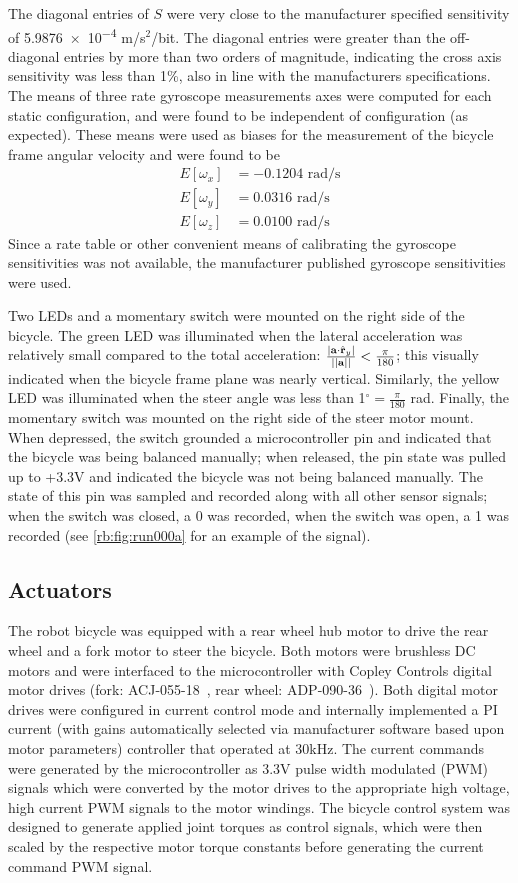 The diagonal entries of $S$ were very close to the manufacturer specified
sensitivity of \num{5.9876e-4} m/s$^2$/bit. The diagonal entries were greater than
the off-diagonal entries by more than two orders of magnitude, indicating the
cross axis sensitivity was less than 1\%, also in line with the manufacturers
specifications. The means of three rate gyroscope measurements axes were
computed for each static configuration, and were found to be independent of
configuration (as expected). These means were used as biases for the
measurement of the bicycle frame angular velocity and were found to be
\begin{align}
  E[\omega_x] &= -0.1204\text{ rad/s}\\
  E[\omega_y] &=  0.0316 \text{ rad/s}\\
  E[\omega_z] &=  0.0100 \text{ rad/s}
\end{align}
Since a rate table or other convenient means of calibrating the gyroscope
sensitivities was not available, the manufacturer published gyroscope
sensitivities were used.

Two LEDs and a momentary switch were mounted on the right side of the bicycle.
The green LED was illuminated when the lateral acceleration was relatively
small compared to the total acceleration: $\frac{|\mathbf{a} \cdot
\hat{\mathbf{r}}_{y}|}{||\mathbf{a}||} < \frac{\pi}{180}$; this visually indicated when the
bicycle frame plane was nearly vertical. Similarly, the yellow LED was
illuminated when the steer angle was less than 1$^\circ = \frac{\pi}{180}$ rad.
Finally, the momentary switch was mounted on the right side of the steer motor
mount. When depressed, the switch grounded a microcontroller pin and indicated
that the bicycle was being balanced manually; when released, the pin state was
pulled up to +3.3V and indicated the bicycle was not being balanced manually.
The state of this pin was sampled and recorded along with all other sensor
signals; when the switch was closed, a 0 was recorded, when the switch was
open, a 1 was recorded (see \autoref{rb:fig:run000a} for an example of the
signal).

\subsection{Actuators} \label{rb:subsec:actuators}
The robot bicycle was equipped with a rear wheel hub motor to drive the rear
wheel and a fork motor to steer the bicycle. Both motors were brushless DC
motors and were interfaced to the microcontroller with Copley Controls digital
motor drives (fork: ACJ-055-18~\cite{CopleyACJ}, rear wheel:
ADP-090-36~\cite{CopleyADP}). Both digital motor drives were configured in
current control mode and internally implemented a PI current (with gains
automatically selected via manufacturer software based upon motor parameters)
controller that operated at 30kHz. The current commands were generated by the
microcontroller as 3.3V pulse width modulated (PWM) signals which were
converted by the motor drives to the appropriate high voltage, high current PWM
signals to the motor windings. The bicycle control system was designed to
generate applied joint torques as control signals, which were then scaled by
the respective motor torque constants before generating the current command PWM
signal.

